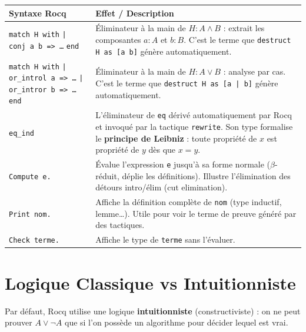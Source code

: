 \documentclass[11pt,a4paper]{article}
\begin{document}
\begin{tabularx}{\textwidth}{@{} l X @{}}
  \toprule
  \textbf{Syntaxe Rocq} & \textbf{Effet / Description} \\
  \midrule
  \texttt{match H with} \newline \texttt{| conj a b => \dots} \newline \texttt{end} &
  Éliminateur à la main de $H : A \land B$ : extrait les composantes $a:A$ et $b:B$.
  C'est le terme que \texttt{destruct H as [a b]} génère automatiquement. \\
  \midrule
  \texttt{match H with} \newline \texttt{| or\_introl a => \dots} \newline \texttt{| or\_intror b => \dots} \newline \texttt{end} &
  Éliminateur à la main de $H : A \lor B$ : analyse par cas.
  C'est le terme que \texttt{destruct H as [a | b]} génère automatiquement. \\
  \midrule
  \texttt{eq\_ind} & L'éliminateur de \texttt{eq} dérivé automatiquement par Rocq et invoqué par la
  tactique \texttt{rewrite}. Son type formalise le \textbf{principe de Leibniz} : toute propriété de
  $x$ est propriété de $y$ dès que $x = y$.\\
  \midrule
  \texttt{Compute e.} &
  Évalue l'expression \texttt{e} jusqu'à sa forme normale ($\beta$-réduit, déplie les définitions).
  Illustre l'élimination des détours intro/élim (cut elimination).\\
  \midrule
  \texttt{Print nom.} &
  Affiche la définition complète de \texttt{nom} (type inductif, lemme\ldots).
  Utile pour voir le terme de preuve généré par des tactiques. \\
  \midrule
  \texttt{Check terme.} &
  Affiche le type de \texttt{terme} sans l'évaluer. \\
  \bottomrule
\end{tabularx}

\vspace{0.5cm}

\section{Logique Classique vs Intuitionniste}

Par défaut, Rocq utilise une logique \textbf{intuitionniste} (constructiviste) : on ne peut prouver $A \lor \neg A$ que si l'on possède un algorithme pour décider lequel est vrai.
\end{document}

